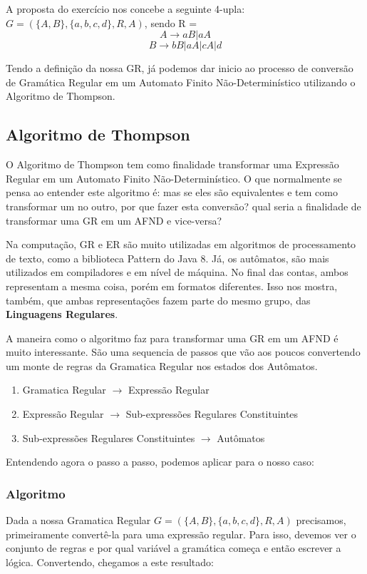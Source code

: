 \documentclass[
	article,			%
	11pt,				%
	oneside,			%
	a4paper,			%
	english,			%
	brazil,				%
	sumario=tradicional
	]{abntex2}
\begin{document}
    A proposta do exercício nos concebe a seguinte 4-upla:
    $G = (\{A,B\}, \{a,b,c,d\}, R, A)$, sendo R =
        \[A \rightarrow aB | aA\]
\[B \rightarrow bB | aA | cA | d\]
    
    
    Tendo a definição da nossa GR, já podemos dar inicio ao processo de conversão de Gramática Regular em um Automato Finito Não-Determinístico utilizando o Algoritmo de Thompson.
\subsection{Algoritmo de Thompson}
    O Algoritmo de Thompson tem como finalidade transformar uma Expressão Regular em um Automato Finito Não-Determinístico. O que normalmente se pensa ao entender este algoritmo é: mas se eles são equivalentes e tem como transformar um no outro, por que fazer esta conversão? qual seria a finalidade de transformar uma GR em um AFND e vice-versa?  
    
    Na computação, GR e ER são muito utilizadas em algoritmos de processamento de texto, como a biblioteca Pattern do Java 8. Já, os autômatos, são mais utilizados em compiladores e em nível de máquina. No final das contas, ambos representam a mesma coisa, porém em formatos diferentes. Isso nos mostra, também, que ambas representações fazem parte do mesmo grupo, das \textbf{Linguagens Regulares}.
    
    A maneira como o algoritmo faz para transformar uma GR em um AFND é muito interessante. São uma sequencia de passos que vão aos poucos convertendo um monte de regras da Gramatica Regular nos estados dos Autômatos.
    
    \begin{enumerate}
        \item Gramatica Regular $\rightarrow$ Expressão Regular
        \item Expressão Regular $\rightarrow$ Sub-expressões Regulares Constituintes
        \item Sub-expressões Regulares Constituintes $\rightarrow$ Autômatos
    \end{enumerate}
    
    Entendendo agora o passo a passo, podemos aplicar para o nosso caso:
    
\subsubsection{Algoritmo}
\cite{dca_conversao_gr_afnd}
    Dada a nossa Gramatica Regular $G = (\{A,B\}, \{a,b,c,d\}, R, A)$ precisamos, primeiramente convertê-la para uma expressão regular. Para isso, devemos ver o conjunto de regras e por qual variável a gramática começa e então escrever a lógica. Convertendo, chegamos a este resultado:
    
\end{document}
